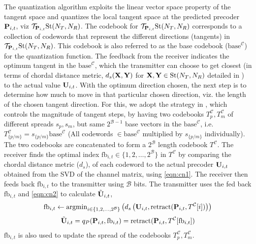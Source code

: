 \documentclass[conference]{IEEEtran}
\begin{document}
The quantization algorithm exploits the linear vector space property of the tangent space and quantizes the local tangent space at the predicted precoder ${\bf P}_{i,t}$, viz $\mathcal{T}_{{\bf P}_{i,t}} \text{St}(N_T,N_R)$.
The codebook for $\mathcal{T}_{{\bf P}_{i,t}} \text{St}(N_T,N_R)$ corresponds to a collection of codewords that represent the different directions (tangents) in $\mathcal{T}_{{\bf P}_{i,t}} \text{St}(N_T,N_R)$.
This codebook is also referred to as the base codebook ($\text{base}^{\mathcal{C}}$) for the quantization function.
The feedback from the receiver indicates the optimum tangent in the $\text{base}^{\mathcal{C}}$, which the transmitter can choose to get closest (in terms of chordal distance metric, $d_s({\bf X},{\bf Y})$ for ${\bf X},{\bf Y} \in \text{St}(N_T,N_R)$ detailed in \cite{Gupt1905:Predictive,6891198}) to the actual value ${\bf U}_{i,t}$.
With the optimum direction chosen, the next step is to determine how much to move in that particular chosen direction, viz. the length of the chosen tangent direction.
For this, we adopt the strategy in \cite{6891198}, which controls the magnitude of tangent steps, by having two codebooks $T^{\mathcal{C}}_p,T^{\mathcal{C}}_m$ of different spreads $s_p,s_m$, but same $2^{\mathcal{B}-1}$ base vectors in the $\text{base}^{\mathcal{C}}$, i.e. $T^{\mathcal{C}}_{\{p/m\}}=s_{\{p/m\}}\text{base}^{\mathcal{C}}$ (All codewords $\in \text{base}^{\mathcal{C}}$ multiplied by $s_{\{p/m\}}$ individually).
The two codebooks are concatenated to form a $2^\mathcal{B}$ length codebook $T^\mathcal{C}$.
The receiver finds the optimal index $\text{fb}_{i,t} \in \{1,2,\ldots,2^{\mathcal{B}}\}$ in $T^\mathcal{C}$ by comparing the chordal distance metric ($d_s$), of each codeword to the actual precoder ${\bf U}_{i,t}$ obtained from the SVD of the channel matrix, using \eqref{eqn:cn1}. The receiver then feeds back $\text{fb}_{i,t}$ to the transmitter using $\mathcal{B}$ bits. The transmitter uses the fed back $\text{fb}_{i,t}$ and \eqref{eqn:cn2} to calculate $\tilde{{\bf U}}_{i,t}$,
\begin{equation}
\label{eqn:cn1}
\text{fb}_{i,t} \gets \text{argmin}_{i \in \{1,2,\ldots,2^{\mathcal{B}}\}}\left (d_s\left (\bU_{i,t},\text{retract}(\bP_{i,t},T^\mathcal{C}[i])\right ) \right)
\end{equation}
\begin{equation}
\tilde{\bU}_{i,t}=q_P(\bP_{i,t},\text{fb}_{i,t})=\text{retract}(\bP_{i,t},T^\mathcal{C}[\text{fb}_{i,t}])
\label{eqn:cn2}
\end{equation}
$\text{fb}_{i,t}$ is also used to update the spread of the codebooks $T^{\mathcal{C}}_p,T^{\mathcal{C}}_m$.
\end{document}
